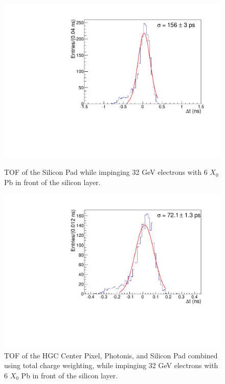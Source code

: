 \documentclass[twocolumn,aps,prd,reprint,superscriptaddress,floatfix]{revtex4-1}
\begin{document}
\begin{figure}[!htb]
	\centering
	\includegraphics[width=\linewidth]{deltaTSiPad.pdf}
	\caption{TOF of the Silicon Pad while impinging 32 GeV electrons with 6 $X_0$ Pb in front of the silicon layer.}
	\label{fig:SiPad}

\centering
	\includegraphics[width=\linewidth]{deltaT_Center_MCP_SiPad_TotalCharge.pdf}
	\caption{TOF of the HGC Center Pixel, Photonis, and Silicon Pad combined using total charge weighting, while impinging 32 GeV electrons with 6 $X_0$ Pb in front of the silicon layer.}
	\label{fig:wctc}
\end{figure}
\end{document}
